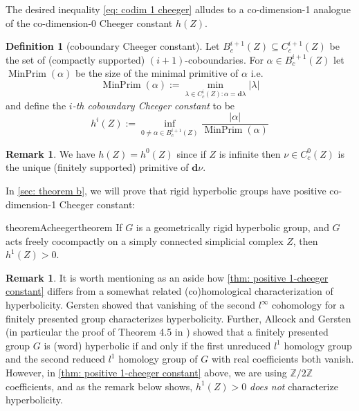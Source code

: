 \documentclass{amsart}
\numberwithin{equation}{section}
\newtheorem{theoremA}{Theorem}
\theoremstyle{definition}
\newtheorem{definition}[theorem]{Definition}
\newtheorem{remark}[theorem]{Remark}
\newcommand{\bbZ}{\mathbb{Z}}
\newcommand{\bfd}{\mathbf{d}}
\DeclareMathOperator{\MP}{MinPrim}
\begin{document}
The desired inequality \eqref{eq: codim 1 cheeger} alludes to a co-dimension-1 analogue of the co-dimension-0 Cheeger constant $h(Z)$.

\begin{definition}[coboundary Cheeger constant]
 Let $B^{i+1}_c(Z)\subseteq C^{i+1}_c(Z)$ be the set of (compactly supported) $(i+1)$-coboundaries.
For  $\alpha\in B^{i+1}_c(Z)$  let $\MP(\alpha)$ be the size of the minimal primitive of $\alpha$ i.e.
$$\MP(\alpha) := \min_{\lambda\in C_c^i(Z): \alpha = \bfd \lambda}|\lambda|$$
and define the \emph{$i$-th coboundary Cheeger constant} to be
\begin{equation}\label{eq: codim i cheeger}
     h^i(Z) := \inf_{0\ne \alpha\in B^{i+1}_c(Z)}\frac {|\alpha|}{\MP(\alpha)}
\end{equation}
\end{definition}
\begin{remark}
    We have $h(Z) = h^0(Z)$ since if $Z$ is infinite then $\nu\in C^0_c(Z)$ is the unique (finitely supported) primitive of $\bfd\nu$.
\end{remark}

In \cref{sec: theorem b}, 
we will prove that rigid hyperbolic groups have positive co-dimension-1 Cheeger constant:
\begin{restatable}{theoremA}{cheegertheorem}\label{thm: positive 1-cheeger constant}
    If $G$ is a geometrically rigid hyperbolic group, and $G$ acts freely cocompactly on a simply connected simplicial complex $Z$, then $h^1(Z)>0$.
\end{restatable}

\begin{remark}
    It is worth mentioning as an aside how \cref{thm: positive 1-cheeger constant} differs from a somewhat related (co)homological characterization of hyperbolicity. Gersten \cite{gersten} showed that vanishing of the second $l^\infty$ cohomology for a finitely presented group characterizes hyperbolicity. Further, Allcock and Gersten \cite{allcock-gersten} (in particular the proof of Theorem 4.5 in \cite[p. 731]{allcock-gersten}) showed that a finitely presented group $G$ is (word) hyperbolic if and only if  the first unreduced $l^1$ homology group and the second reduced $l^1$ homology group of $G$ with real coefficients both vanish.  However, in \cref{thm: positive 1-cheeger constant} above, we are using $\bbZ/2\bbZ$ coefficients, and as the remark below shows, $h^1(Z)>0$ \emph{does not} characterize hyperbolicity.
\end{remark}
\end{document}

